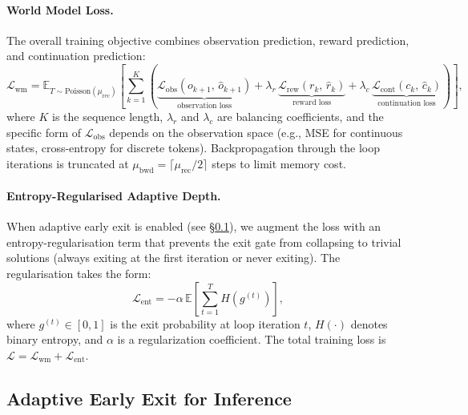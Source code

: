 \paragraph{World Model Loss.}
The overall training objective combines observation prediction, reward prediction, and continuation prediction:
\begin{equation}
  \mathcal{L}_{\mathrm{wm}} =
    \mathbb{E}_{T \sim \mathrm{Poisson}(\mu_{\mathrm{rec}})}
    \left[
      \sum_{k=1}^{K}
      \left(
        \underbrace{\mathcal{L}_{\mathrm{obs}}(o_{k+1},\, \hat{o}_{k+1})}
          _{\text{observation loss}}
        + \lambda_r\,
          \underbrace{\mathcal{L}_{\mathrm{rew}}(r_k,\, \hat{r}_k)}
          _{\text{reward loss}}
        + \lambda_c\,
          \underbrace{\mathcal{L}_{\mathrm{cont}}(c_k,\, \hat{c}_k)}
          _{\text{continuation loss}}
      \right)
    \right],
  \label{eq:wm_loss}
\end{equation}
where $K$ is the sequence length, $\lambda_r$ and $\lambda_c$ are balancing coefficients, and the specific form of $\mathcal{L}_{\mathrm{obs}}$ depends on the observation space (e.g., MSE for continuous states, cross-entropy for discrete tokens). Backpropagation through the loop iterations is truncated at $\mu_{\mathrm{bwd}} = \lceil \mu_{\mathrm{rec}} / 2 \rceil$ steps to limit memory cost.

\paragraph{Entropy-Regularised Adaptive Depth.} When adaptive early exit is enabled (see \S\ref{sec:earlyexit}), we augment the loss with an entropy-regularisation term that prevents the exit gate from collapsing to trivial solutions (always exiting at the first iteration or never exiting). The regularisation takes the form:
\begin{equation}
  \mathcal{L}_{\mathrm{ent}} =
    -\alpha\, \mathbb{E}
    \left[
      \sum_{t=1}^{T} H\!\left(g^{(t)}\right)
    \right],
  \label{eq:entropy_reg}
\end{equation}
where $g^{(t)} \in [0, 1]$ is the exit probability at loop iteration $t$, $H(\cdot)$ denotes binary entropy, and $\alpha$ is a regularization coefficient. The total training loss is $\mathcal{L} = \mathcal{L}_{\mathrm{wm}} + \mathcal{L}_{\mathrm{ent}}$.

\subsection{Adaptive Early Exit for Inference}
\label{sec:earlyexit}

